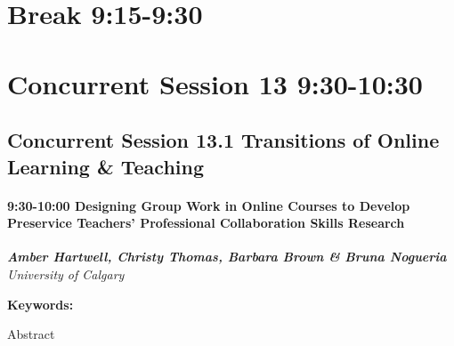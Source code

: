 \documentclass[
]{book}
\begin{document}
\hypertarget{break-915-930-2}{%
\section*{Break \textbar{} 9:15-9:30}\label{break-915-930-2}}

\hypertarget{concurrent-session-13-930-1030}{%
\section*{Concurrent Session 13 \textbar{} 9:30-10:30}\label{concurrent-session-13-930-1030}}

\hypertarget{concurrent-session-13.1-transitions-of-online-learning-teaching}{%
\subsection*{Concurrent Session 13.1 \textbar{} Transitions of Online Learning \& Teaching}\label{concurrent-session-13.1-transitions-of-online-learning-teaching}}

\begin{session}
\hypertarget{designing-group-work-in-online-courses-to-develop-preservice-teachers-professional-collaboration-skills-research}{%
\paragraph*{\texorpdfstring{9:30-10:00 \textbar{} \textbf{Designing
Group Work in Online Courses to Develop Preservice Teachers'
Professional Collaboration Skills} \textbar{}
Research}{9:30-10:00 \textbar{} Designing Group Work in Online Courses to Develop Preservice Teachers' Professional Collaboration Skills \textbar{} Research}}\label{designing-group-work-in-online-courses-to-develop-preservice-teachers-professional-collaboration-skills-research}}

\textbf{\emph{Amber Hartwell, Christy Thomas, Barbara Brown \& Bruna
Nogueria}} \textbar{} \emph{University of Calgary}

\textbf{Keywords:}

Abstract
\end{session}
\end{document}
